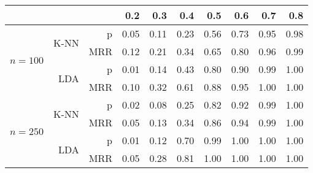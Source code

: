 \documentclass{article}
\begin{document}
\begin{table}[ht]
\begin{center}
\begin{tabular}{|r|r|r|rrrrrrr|}
  \hline
 & & & 0.2 & 0.3 & 0.4 & 0.5 & 0.6 & 0.7 & 0.8 \\ 
  \hline
\multirow{4}{*}{$n = 100$} & \multirow{2}{*}{K-NN} & p & 0.05 & 0.11 & 0.23 & 0.56 & 0.73 & 0.95 & 0.98 \\ 
  & & MRR & 0.12 & 0.21 & 0.34 & 0.65 & 0.80 & 0.96 & 0.99 \\
  \cline{2-10}
  & \multirow{2}{*}{LDA} & p & 0.01 & 0.14 & 0.43 & 0.80 & 0.90 & 0.99
  & 1.00 \\ 
  & & MRR & 0.10 & 0.32 & 0.61 & 0.88 & 0.95 & 1.00 & 1.00 \\
  \hline
\multirow{4}{*}{$n = 250$} & \multirow{2}{*}{K-NN} & p & 0.02 & 0.08 & 0.25 & 0.82 & 0.92 & 0.99 & 1.00 \\ 
  & & MRR & 0.05 & 0.13 & 0.34 & 0.86 & 0.94 & 0.99 & 1.00 \\ \cline{2-10}
  & \multirow{2}{*}{LDA} & p & 0.01 & 0.12 & 0.70 & 0.99 & 1.00 & 1.00 & 1.00 \\ 
  & & MRR & 0.05 & 0.28 & 0.81 & 1.00 & 1.00 & 1.00 & 1.00 \\ 
   \hline
\end{tabular}
\end{center}
\end{table}
\end{document}
